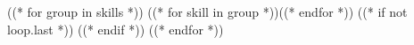 
\begingroup\raggedright
  ((* for group in skills *))
    ((* for skill in group *))((* endfor *))
    ((* if not loop.last *))
      \divider
    ((* endif *))
  ((* endfor *))
\par\endgroup
